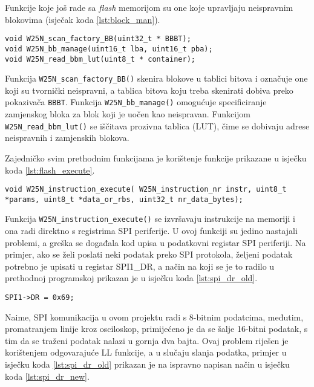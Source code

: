 Funkcije koje još rade sa \textit{flash} memorijom su one koje upravljaju neispravnim blokovima (isječak koda \ref{lst:block_man}).

\begin{lstlisting}[caption=Funkcije za upravljanje neispravnim blokovima, label={lst:block_man}]
void W25N_scan_factory_BB(uint32_t * BBBT);
void W25N_bb_manage(uint16_t lba, uint16_t pba);
void W25N_read_bbm_lut(uint8_t * container);
\end{lstlisting}

\noindent Funkcija \verb|W25N_scan_factory_BB()| skenira blokove u tablici bitova i označuje one koji su tvornički neispravni, a tablica bitova koju treba skenirati dobiva preko pokazivača \verb|BBBT|. Funkcija \verb|W25N_bb_manage()| omogućuje specificiranje zamjenskog bloka za blok koji je uočen kao neispravan. Funkcijom \verb|W25N_read_bbm_lut()| se iščitava prozivna tablica (LUT), čime se dobivaju adrese neispravnih i zamjenskih blokova.

Zajedničko svim prethodnim funkcijama je korištenje funkcije prikazane u isječku koda \ref{lst:flash_execute}.

\begin{lstlisting}[caption=Funkcija za izvođenje instrukcije na \textit{flash} memoriji, label={lst:flash_execute}]
void W25N_instruction_execute( W25N_instruction_nr instr, uint8_t *params, uint8_t *data_or_rbs, uint32_t nr_data_bytes);
\end{lstlisting}

\noindent Funkcija \verb|W25N_instruction_execute()| se izvršavaju instrukcije na  memoriji i ona radi direktno s registrima SPI periferije. U ovoj funkciji su jedino nastajali problemi, a greška se događala kod upisa u podatkovni registar SPI periferiji. Na primjer, ako se želi poslati neki podatak preko SPI protokola, željeni podatak potrebno je upisati u registar SPI1\_DR, a način na koji se je to radilo u prethodnoj programskoj prikazan je u isječku koda \ref{lst:spi_dr_old}.

\begin{lstlisting}[caption=Upis podatka u SPI2\_DR registar, label={lst:spi_dr_old}]
SPI1->DR = 0x69;
\end{lstlisting}

\noindent Naime, SPI komunikacija u ovom projektu radi s 8-bitnim podatcima, međutim, promatranjem linije kroz osciloskop, primijećeno je da se šalje 16-bitni podatak, s tim da se traženi podatak nalazi u gornja dva bajta. Ovaj problem riješen je korištenjem odgovarajuće LL funkcije, a u slučaju slanja podatka, primjer u isječku koda \ref{lst:spi_dr_old} prikazan je na ispravno napisan način u isječku koda \ref{lst:spi_dr_new}.

